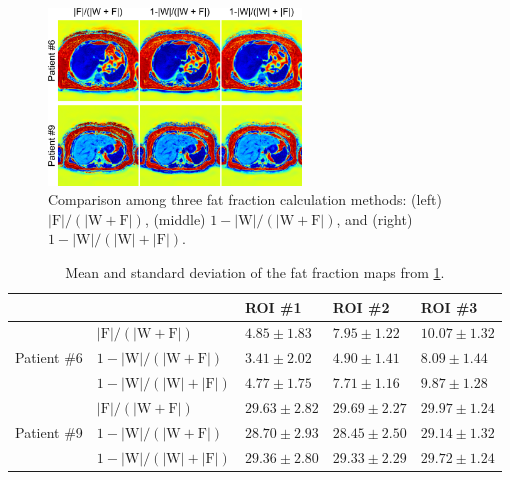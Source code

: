 \documentclass[a4paper,11pt]{report}
\begin{document}
\begin{enumerate}[resume]
\begin{figure}[h!]
	\centering
	\includegraphics[width=0.6\textwidth]{../../figures/supp_tan2.png}
	\caption{Comparison among three fat fraction calculation methods: 
		(left) $|\mathrm{F}| / (|\mathrm{W} + \mathrm{F}|)$, 
		(middle) $1 - |\mathrm{W}| / (|\mathrm{W} + \mathrm{F}|)$, and 
		(right) $1- |\mathrm{W}| / (|\mathrm{W}| + |\mathrm{F}|)$.}
	\label{SUPPFIG:FATFRAC}
\end{figure}

\begin{table}[h!]
	\caption{Mean and standard deviation of the fat fraction maps from \cref{SUPPFIG:FATFRAC}.}
	\begin{tabular}{m{} m{} m{} m{} m{}}
		\toprule
		& & ROI \#1 & ROI \#2 & ROI \#3 \\
		\hline
		\multirow{3}{*}{Patient \#6} & $|\mathrm{F}|/(|\mathrm{W} + \mathrm{F}|)$ & $4.85 \pm 1.83$ & $7.95 \pm 1.22$ & $10.07 \pm 1.32$ \\
		& $1 - |\mathrm{W}|/(|\mathrm{W} + \mathrm{F}|)$ & $3.41 \pm 2.02$ & $4.90 \pm 1.41$ & $8.09 \pm 1.44$ \\
		& $1 - |\mathrm{W}|/(|\mathrm{W}| + |\mathrm{F}|)$ & $4.77 \pm 1.75$ & $7.71 \pm 1.16$ & $9.87 \pm 1.28$ \\
		\midrule
		\multirow{3}{*}{Patient \#9} & $|\mathrm{F}|/(|\mathrm{W} + \mathrm{F}|)$ & $29.63 \pm 2.82$ & $29.69 \pm 2.27$ & $29.97 \pm 1.24$ \\
		& $1 - |\mathrm{W}|/(|\mathrm{W} + \mathrm{F}|)$ & $28.70 \pm 2.93$ & $28.45 \pm 2.50$ & $29.14 \pm 1.32$ \\
		& $1 - |\mathrm{W}|/(|\mathrm{W}| + |\mathrm{F}|)$ & $29.36 \pm 2.80$ & $29.33 \pm 2.29$ & $29.72 \pm 1.24$ \\
		\bottomrule
	\end{tabular}
	\label{SUPPTAB:FATFRAC}
\end{table}


\end{enumerate}
\end{document}
